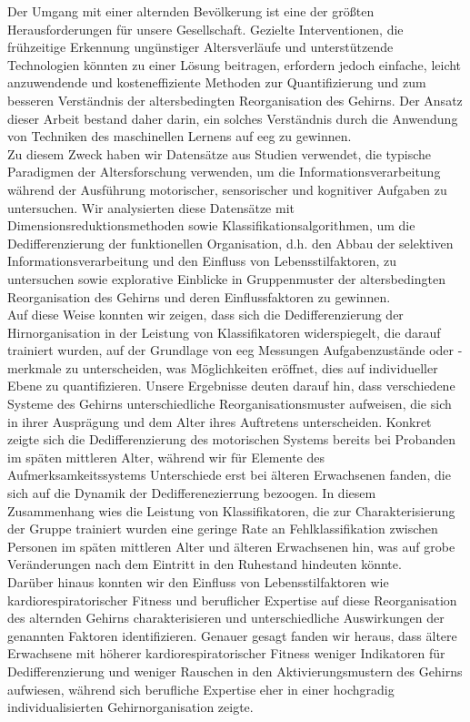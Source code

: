Der Umgang mit einer alternden Bevölkerung ist eine der größten Herausforderungen für unsere Gesellschaft. Gezielte Interventionen, die frühzeitige Erkennung ungünstiger Altersverläufe und unterstützende Technologien könnten zu einer Lösung beitragen, erfordern jedoch einfache, leicht anzuwendende und kosteneffiziente Methoden zur Quantifizierung und zum besseren Verständnis der altersbedingten Reorganisation des Gehirns. Der Ansatz dieser Arbeit bestand daher darin, ein solches Verständnis durch die Anwendung von Techniken des maschinellen Lernens auf \gls{eeg} zu gewinnen.\\
Zu diesem Zweck haben wir Datensätze aus Studien verwendet, die typische Paradigmen der Altersforschung verwenden, um die Informationsverarbeitung während der Ausführung motorischer, sensorischer und kognitiver Aufgaben zu untersuchen. Wir analysierten diese Datensätze mit Dimensionsreduktionsmethoden sowie Klassifikationsalgorithmen, um die Dedifferenzierung der funktionellen Organisation, d.h. den Abbau der selektiven Informationsverarbeitung und den Einfluss von Lebensstilfaktoren, zu untersuchen sowie explorative Einblicke in Gruppenmuster der altersbedingten Reorganisation des Gehirns und deren Einflussfaktoren zu gewinnen.\\
Auf diese Weise konnten wir zeigen, dass sich die Dedifferenzierung der Hirnorganisation in der Leistung von Klassifikatoren widerspiegelt, die darauf trainiert wurden, auf der Grundlage von \gls{eeg} Messungen Aufgabenzustände oder -merkmale zu unterscheiden, was Möglichkeiten eröffnet, dies auf individueller Ebene zu quantifizieren. Unsere Ergebnisse deuten darauf hin, dass verschiedene Systeme des Gehirns unterschiedliche Reorganisationsmuster aufweisen, die sich in ihrer Ausprägung und dem Alter ihres Auftretens unterscheiden. Konkret zeigte sich die Dedifferenzierung des motorischen Systems bereits bei Probanden im späten mittleren Alter, während wir für Elemente des Aufmerksamkeitssystems Unterschiede erst bei älteren Erwachsenen fanden, die sich auf die Dynamik der Dedifferenezierrung bezoogen. In diesem Zusammenhang wies die Leistung von Klassifikatoren, die zur Charakterisierung der Gruppe trainiert wurden eine geringe Rate an Fehlklassifikation zwischen Personen im späten mittleren Alter und älteren Erwachsenen hin, was auf grobe Veränderungen nach dem Eintritt in den Ruhestand hindeuten könnte.\\
Darüber hinaus konnten wir den Einfluss von Lebensstilfaktoren wie kardiorespiratorischer Fitness und beruflicher Expertise auf diese Reorganisation des alternden Gehirns charakterisieren und unterschiedliche Auswirkungen der genannten Faktoren identifizieren. Genauer gesagt fanden wir heraus, dass ältere Erwachsene mit höherer kardiorespiratorischer Fitness weniger Indikatoren für Dedifferenzierung und weniger Rauschen in den Aktivierungsmustern des Gehirns aufwiesen, während sich berufliche Expertise eher in einer hochgradig individualisierten Gehirnorganisation zeigte.\\
